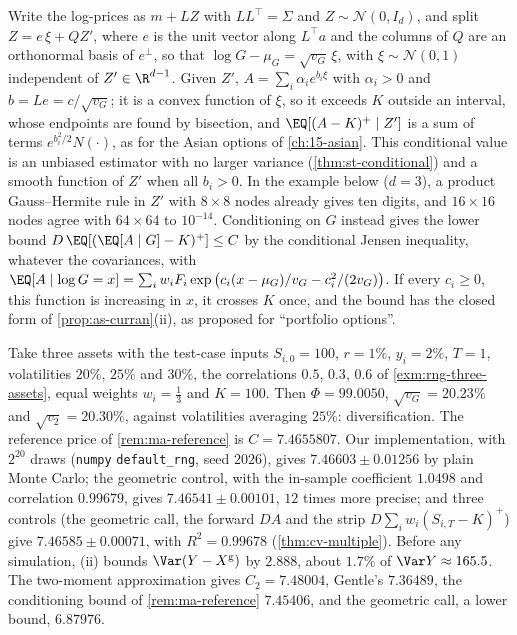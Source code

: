 \begin{remark}\label{rem:ma-reference}
Write the log-prices as $m+LZ$ with $LL^\top=\Sigma$ and $Z\sim\mathcal N(0,I_d)$, and split
$Z=e\,\xi+QZ'$, where $e$ is the unit vector along $L^\top a$ and the columns of $Q$ are an orthonormal
basis of $e^\perp$, so that $\log G-\mu_G=\sqrt{v_G}\,\xi$, with
$\xi\sim\mathcal N(0,1)$ independent of $Z'\in\R^{d-1}$. Given $Z'$, $A=\sum_i\alpha_ie^{b_i\xi}$ with
$\alpha_i>0$ and $b=Le=c/\sqrt{v_G}$; it is a convex function of $\xi$, so it exceeds $K$ outside an
interval, whose endpoints are found by bisection, and $\EQ[(A-K)^+\mid Z']$ is a sum of terms
$e^{b_i^2/2}N(\cdot)$, as for the Asian options of \cref{ch:15-asian}. This conditional
value is an unbiased estimator with no larger variance (\cref{thm:st-conditional}) and a smooth function
of $Z'$ when all $b_i>0$. In the example below ($d=3$), a product Gauss--Hermite rule in $Z'$ with
$8\times8$ nodes already gives ten digits, and $16\times16$ nodes agree with $64\times64$ to $10^{-14}$.
Conditioning on $G$ instead gives the lower bound $D\,\EQ[(\EQ[A\mid G]-K)^+]\le C$ by the conditional
Jensen inequality, whatever the covariances, with
$\EQ[A\mid\log G=x]=\sum_iw_iF_i\exp\big(c_i(x-\mu_G)/v_G-c_i^2/(2v_G)\big)$. If every $c_i\ge0$, this function is
increasing in $x$, it crosses $K$ once, and the bound has the closed form of \cref{prop:as-curran}(ii), as
\textcite{curran} proposed for ``portfolio options''.
\end{remark}

\begin{example}\label{exa:ma-basket}
Take three assets with the test-case inputs $S_{i,0}=100$, $r=1\%$, $y_i=2\%$, $T=1$, volatilities
$20\%$, $25\%$ and $30\%$, the correlations $0.5$, $0.3$, $0.6$ of \cref{exm:rng-three-assets}, equal
weights $w_i=\frac13$ and $K=100$. Then $\Phi=99.0050$, $\sqrt{v_G}=20.23\%$ and $\sqrt{v_2}=20.30\%$,
against volatilities averaging $25\%$: diversification. The reference price of
\cref{rem:ma-reference} is $C=7.4655807$. Our implementation, with $2^{20}$ draws (\texttt{numpy}
\texttt{default\_rng}, seed $2026$), gives
$7.46603\pm0.01256$ by plain Monte Carlo; the geometric control, with the in-sample coefficient
$1.0498$ and correlation $0.99679$, gives $7.46541\pm0.00101$, $12$ times more precise; and three
controls (the geometric call, the forward $DA$ and the strip $D\sum_iw_i(S_{i,T}-K)^+$) give
$7.46585\pm0.00071$, with $R^2=0.99678$ (\cref{thm:cv-multiple}). Before any simulation, (ii) bounds
$\Var(Y-X^{\mathrm g})$ by $2.888$, about $1.7\%$ of $\Var Y\approx165.5$. The two-moment
approximation gives $C_2=7.48004$, Gentle's $7.36489$, the conditioning bound of
\cref{rem:ma-reference} $7.45406$, and the geometric call, a lower bound, $6.87976$.
\end{example}

